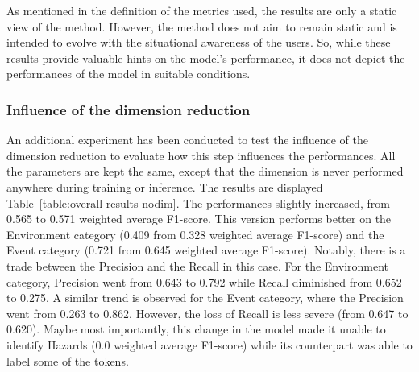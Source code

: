 As mentioned in the definition of the metrics used, the results are only a static view of the method.
However, the method does not aim to remain static and is intended to evolve with the situational awareness of the users.
So, while these results provide valuable hints on the model's performance, it does not depict the performances of the model in suitable conditions.


\subsubsection{Influence of the dimension reduction}
An additional experiment has been conducted to test the influence of the dimension reduction to evaluate how this step influences the performances.
All the parameters are kept the same, except that the dimension is never performed anywhere during training or inference.
The results are displayed Table~\ref{table:overall-results-nodim}.
The performances slightly increased, from 0.565 to 0.571 weighted average F1-score.
This version performs better on the Environment category (0.409 from 0.328 weighted average F1-score) and the Event category (0.721 from 0.645 weighted average F1-score).
Notably, there is a trade between the Precision and the Recall in this case.
For the Environment category, Precision went from 0.643 to 0.792 while Recall diminished from 0.652 to 0.275.
A similar trend is observed for the Event category, where the Precision went from 0.263 to 0.862.
However, the loss of Recall is less severe (from 0.647 to 0.620).
Maybe most importantly, this change in the model made it unable to identify Hazards (0.0 weighted average F1-score) while its counterpart was able to label some of the tokens.

